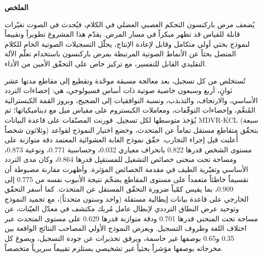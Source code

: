 \clearpage
\thispagestyle{plain}
\begin{center}
\begin{Arabic}
{\LARGE \textbf{الملخص}}
\end{Arabic}
\end{center}
\vspace{12pt}
\begin{Arabic}
يُضعف مرض باركنسون التحكم العصبي العضلي في الكلام، فيُحدث في الصوت
تغيّرات قابلة للقياس قد تظهر مبكراً في مسار المرض. يقدّم هذا المشروع
تطويراً وتقييماً لنموذج بحثي أولي متكامل وقابل لإعادة الإنتاج، يحلّل
التسجيلات الصوتية الخام للكلام المتصل بحثاً عن الأنماط الصوتية
المرتبطة بمرض باركنسون باستخدام تعلّم الآلة التقليدي القابل للتفسير،
مع تركيز خاص على التحقّق الأمين من الأداء.

تُستخلص من كل تسجيل، بعد معالجة مسبقة موحّدة وتقطيع إلى مقاطع مدتها
عشر ثوانٍ، أربع وسبعون خاصية صوتية ذات أساس فسيولوجي، هي: إحصاءات
التردد الأساسي، والارتجاف، والتذبذب، ونسبة التوافقيات إلى الضجيج،
وبروز القمة الكبسترالية المُنعَّم، وإحصاءات التوقّفات، ومعاملات
الكبستروم على مقياس ميل مع ديناميكياتها؛ ثم يُؤخذ متوسطها لكل
تسجيل. قورنت المصنّفات على قاعدة البيانات MDVR-KCL (سبعة وثلاثون
شخصاً) بتحقّق متقاطع مستقل تماماً عن المتحدث، وخضع اختيار النموذج
لقواعد أُعلنت قبل إجراء التجارب. حقّق نموذج الغابة العشوائية المعتمد
دقة متوازنة على مستوى الشخص قدرها \textenglish{0.822} بانحراف معياري
\textenglish{0.032}، وحساسية \textenglish{0.771}، ونوعية
\textenglish{0.873}، ومساحة تحت منحنى خصائص التشغيل للمستقبِل قدرها
\textenglish{0.864}، وكان مدى التردد الأساسي وتغيّرية الطيف في
مقدمة الخصائص المؤثرة. وأظهرت مقارنة مضبوطة أن تقسيماً خاطئاً متعمداً
على مستوى المقاطع يضخّم نتيجة الأنبوب نفسه من \textenglish{0.775} إلى
\textenglish{0.909}، بما يقيس كمّياً ضرورة التحقّق المستقل عن
المتحدث. كما أسفر التحقّق الخارجي على قاعدة بيانات إيطالية مستقلة
(واحد وستون متحدثاً)، مع تجميد النموذج وتوحيد عرض النطاق الترددي
لإبطال عامل مُربك مكتشف في معدّل العيّنات، عن مساحة تحت المنحنى قدرها
\textenglish{0.701} ودقة متوازنة قدرها \textenglish{0.629} على مستوى
المتحدث عبر اختلاف اللغة وظروف التسجيل. ويعرض النموذج الأولي المصاحب
النتائج الواقعة بين \textenglish{0.35} و\textenglish{0.65} بوصفها
غير حاسمة، ويرفق تحذيرات عن جودة التسجيل، ويصوغ كل مخرجاته بوصفها
مؤشراً بحثياً غير تشخيصي يستلزم تقييماً سريرياً متخصصاً.
\end{Arabic}
\clearpage
